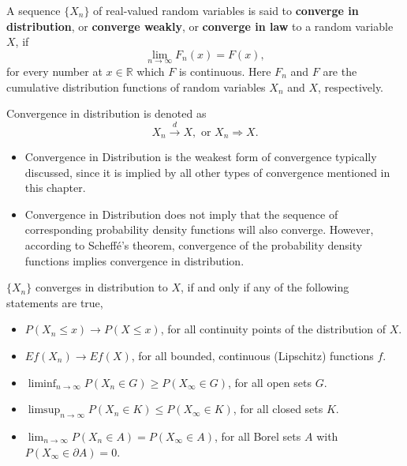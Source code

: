 \begin{definition} \label{def:convergence-in-distribution}
    A sequence $\{X_n\}$ of real-valued random variables is said to \textbf{converge in distribution}, or \textbf{converge weakly}, or \textbf{converge in law} to a random variable $X$, if
    \begin{equation}
        \lim_{n\to\infty}F_n(x)=F(x),
    \end{equation}
    for every number at $x\in\mathbb{R}$ which $F$ is continuous. Here $F_n$ and $F$ are the cumulative distribution functions of random variables $X_n$ and $X$, respectively.

    Convergence in distribution is denoted as
    \begin{equation}
        X_n \stackrel{d}{\rightarrow} X, \text{ or } X_n \Rightarrow X.
    \end{equation}
\end{definition}

\begin{itemize}
    \item Convergence in Distribution is the weakest form of convergence typically discussed, since it is implied by all other types of convergence mentioned in this chapter.
    \item Convergence in Distribution does not imply that the sequence of corresponding probability density functions will also converge. However, according to Scheff\'e's theorem, convergence of the probability density functions implies convergence in distribution.
\end{itemize}

\begin{theorem} \label{thm:portmanteau-lemma}
    $\{X_n\}$ converges in distribution to $X$, if and only if any of the following statements are true,
    \begin{itemize}
        \item $P(X_n\leq x)\rightarrow P(X\leq x)$, for all continuity points of the distribution of $X$.
        \item $Ef(X_n)\rightarrow Ef(X)$, for all bounded, continuous (Lipschitz) functions $f$.
        \item $\liminf_{n\rightarrow\infty}P\left(X_{n} \in G\right)\geq P\left(X_{\infty}\in G\right)$, for all open sets $G$.
        \item $\limsup_{n \rightarrow\infty}P\left(X_{n} \in K\right) \leq P\left(X_{\infty} \in K\right)$, for all closed sets $K$.
        \item $\lim_{n\rightarrow\infty}P\left(X_{n}\in A\right)=P\left(X_{\infty}\in A\right)$, for all Borel sets $A$ with $P\left(X_{\infty}\in \partial A\right)=0$.
    \end{itemize}
\end{theorem}

